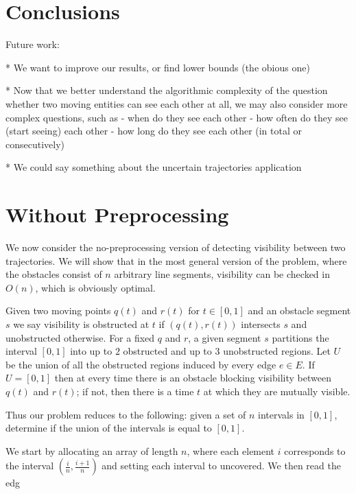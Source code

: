 \documentclass[a4paper, UKenglish]{lipics-v2018}
\begin{document}
\section {Conclusions}
\label {sec:conclusions}

Future work:

* We want to improve our results, or find lower bounds (the obious one)

* Now that we better understand the algorithmic complexity of the question whether two moving entities can see each other at all, we may also consider more complex questions, such as
- when do they see each other
- how often do they see (start seeing) each other
- how long do they see each other (in total or consecutively)

* We could say something about the uncertain trajectories application

\newpage





\newpage
\appendix

\section{Without Preprocessing}
We now consider the no-preprocessing version of detecting visibility between two trajectories. We will show that in the most general version of the problem, where the obstacles consist of $n$ arbitrary line segments, visibility can be checked in $O(n)$, which is obviously optimal.

Given two moving points $q(t)$ and $r(t)$ for $t \in [0, 1]$ and an obstacle segment $s$ we say visibility is obstructed at $t$ if $(q(t), r(t))$ intersects $s$ and unobstructed otherwise. For a fixed $q$ and $r$, a given segment $s$ partitions the interval $[0, 1]$ into up to $2$ obstructed and up to $3$ unobstructed regions. Let $U$ be the union of all the obstructed regions induced by every edge $e \in E$. If $U = [0,1]$ then at every time there is an obstacle blocking visibility between $q(t)$ and $r(t)$; if not, then there is a time $t$ at which they are mutually visible.

Thus our problem reduces to the following: given a set of $n$ intervals in $[0,1]$, determine if the union of the intervals is equal to $[0,1]$.

We start by allocating an array of length $n$, where each element $i$ corresponds to the interval $(\frac{i}{n}, \frac{i+1}{n})$ and setting each interval to uncovered. We then read the edg
\end{document}
